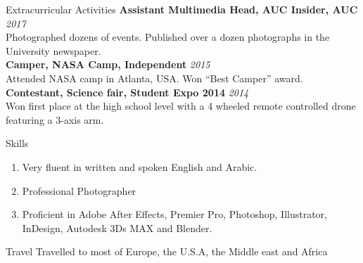 \documentclass{resume}
\begin{document}
\begin{small}
\begin{rSection} {Extracurricular Activities}
		{\bf Assistant Multimedia Head, AUC Insider, AUC} \hfill {\em 2017}\\
		Photographed dozens of events. Published over a dozen photographs in the University newspaper.\\
		{\bf Camper, NASA Camp, Independent} \hfill {\em 2015}\\
		Attended NASA camp in Atlanta, USA. Won “Best Camper” award.\\
		{\bf Contestant, Science fair, Student Expo 2014} \hfill {\em 2014} \\
		Won first place at the high school level with a 4 wheeled remote controlled drone featuring a 3-axis arm.
		
	\end{rSection}
	
	\begin{rSection}{Skills}
		\begin{enumerate}
			\itemsep -0.5em
			\item Very fluent in written and spoken English and Arabic.
			\item Professional Photographer
			\item Proficient in Adobe After Effects, Premier Pro, Photoshop, Illustrator, InDesign, Autodesk 3Ds MAX and Blender.
		\end{enumerate}
	\end{rSection}
	\begin{rSection}{Travel}
		Travelled to most of Europe, the U.S.A, the Middle east and Africa
	\end{rSection}
\end{small}
	
\end{document}
